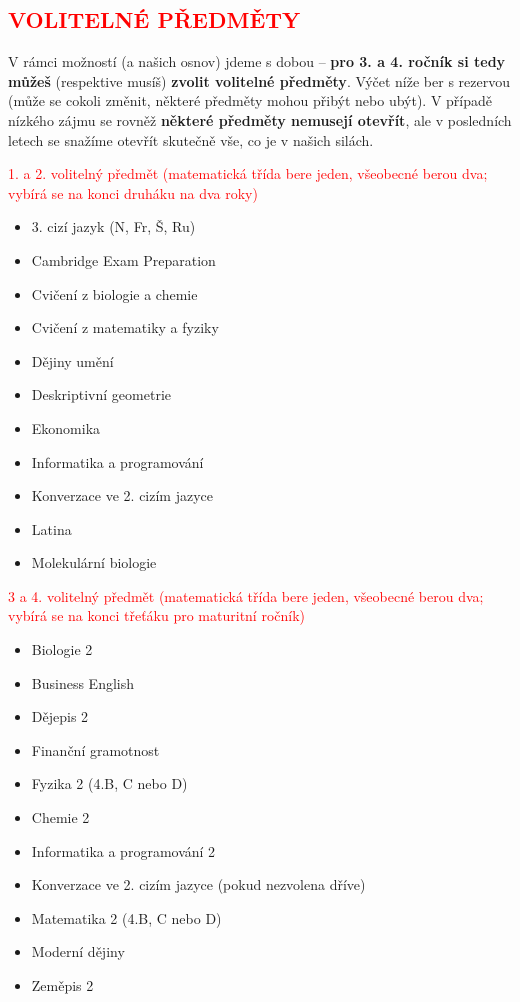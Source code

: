\documentclass{article}
\newcommand{\podnadpis}[1]{
  \subsection*{\textcolor{red}{#1}}
}
\begin{document}
\newpage

\podnadpis{VOLITELNÉ PŘEDMĚTY}

\noindent V rámci možností (a našich osnov) jdeme s dobou -- \textbf{pro 3. a 4. ročník si tedy
můžeš} (respektive musíš) \textbf{zvolit volitelné předměty}. Výčet níže ber s rezervou
(může se cokoli změnit, některé předměty mohou přibýt nebo ubýt). V případě
nízkého zájmu se rovněž \textbf{některé předměty nemusejí otevřít}, ale v posledních
letech se snažíme otevřít skutečně vše, co je v našich silách.

\begin{multicols}{2}
\noindent \textcolor{red}{1. a 2. volitelný předmět (matematická třída bere jeden, všeobecné berou dva; vybírá se na konci druháku na dva roky)}
  \begin{itemize}
    \item 3. cizí jazyk (N, Fr, Š, Ru)
    \item Cambridge Exam Preparation
    \item Cvičení z biologie a chemie
    \item Cvičení z matematiky a fyziky
    \item Dějiny umění
    \item Deskriptivní geometrie
    \item Ekonomika
    \item Informatika a programování
    \item Konverzace ve 2. cizím jazyce
    \item Latina
    \item Molekulární biologie
  \end{itemize}

  \noindent \textcolor{red}{3 a 4. volitelný předmět (matematická třída bere jeden, všeobecné berou dva; vybírá se na konci třeťáku pro maturitní ročník)}
  \begin{itemize}
    \item Biologie 2
    \item Business English
    \item Dějepis 2
    \item Finanční gramotnost
    \item Fyzika 2 (4.B, C nebo D)
    \item Chemie 2
    \item Informatika a programování 2
    \item Konverzace ve 2. cizím jazyce
    (pokud nezvolena dříve)
    \item Matematika 2 (4.B, C nebo D)
    \item Moderní dějiny
    \item Zeměpis 2
  \end{itemize}


\end{multicols}
\end{document}
